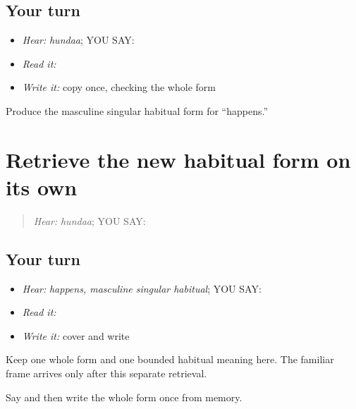 \subsection*{Your turn}
\begin{itemize}
\raggedright
  \item \emph{Hear:} \emph{hundaa}; YOU SAY: \textbf{}
  \item \emph{Read it:} \textbf{}
  \item \emph{Write it:} copy \textbf{} once, checking the whole form
\end{itemize}

\begin{tcolorbox}[breakable,colback=teal!4,colframe=teal!35!black,title={Before you move on}]
Produce the masculine singular habitual form for “happens.”
\end{tcolorbox}
\section[\texorpdfstring{\pa{ਹੁੰਦਾ} (hundaa)}{ਹੁੰਦਾ (hundaa)}]{Retrieve the new habitual form on its own}

\label{lesson:PA-C207-hundaa-review}



\begin{quote}
\emph{Hear:} \emph{hundaa}; YOU SAY: \textbf{}
\end{quote}

\subsection*{Your turn}
\begin{itemize}
\raggedright
  \item \emph{Hear:} \emph{happens, masculine singular habitual}; YOU SAY: \textbf{}
  \item \emph{Read it:} \textbf{}
  \item \emph{Write it:} cover and write \textbf{}
\end{itemize}

\begin{grammarlens}[title={Grammar Lens}]
Keep one whole form and one bounded habitual meaning here. The familiar frame arrives only after this separate retrieval.
\end{grammarlens}

\begin{tcolorbox}[breakable,colback=teal!4,colframe=teal!35!black,title={Before you move on}]
Say and then write the whole form once from memory.
\end{tcolorbox}
